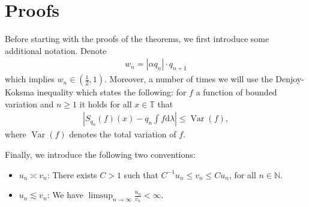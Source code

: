 \documentclass[11pt]{amsart}
\theoremstyle{definition}
\numberwithin{equation}{section}
\def\T{\mathbb{T}}
\DeclareMathOperator{\Var}{Var}
\begin{document}
\section{Proofs}
Before starting with the proofs of the theorems, we first introduce some additional notation. Denote
\begin{align*}
 w_n=|\alpha q_n|\cdot q_{n+1}
\end{align*}
which implies $w_n\in (\frac{1}{2}, 1)$. Moreover, a number of times we will use the Denjoy-Koksma inequality which states the following: for $f$ a function of bounded variation and $n \geq 1$ it holds for all $x\in \T$ that
\begin{align*}
 \left| S_{q_n} (f )(x) - q_n \int f \mathrm{d}\lambda \right|\leq  \Var(f ),
\end{align*}
where $\Var(f)$ denotes the total variation of $f$.

Finally, we introduce the following two conventions: 
\begin{itemize}
 \item $u_n\asymp v_n$: There exists $C>1$ such that $C^{-1}u_n\leq v_n\leq Cu_n$, for all $n\in\mathbb{N}$. 

\item $u_n\lesssim v_n$: We have $\limsup_{n\to\infty}\frac{u_n}{v_n}<\infty$.
\end{itemize}

 
\end{document}
